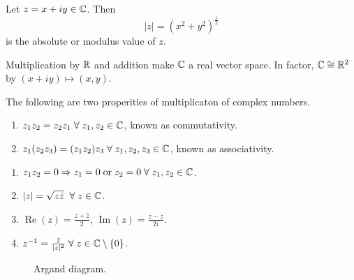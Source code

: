 \begin{definition}
    Let $z = x + iy \in \mathbb{C}$. Then \[ \lvert z \rvert = (x^2 + y^2)^\frac12 \] is the absolute or modulus value of $z$.
\end{definition}

\begin{remark}
    Multiplication by $\mathbb{R}$ and addition make $\mathbb{C}$ a real vector space. In factor, $\mathbb{C} \cong \mathbb{R}^2$ by $(x + iy) \mapsto (x, y)$.
\end{remark}

\begin{proposition}
    The following are two properities of multiplicaton of complex numbers.
    \begin{enumerate}
        \item $z_1z_2 = z_2z_1 \; \forall \; z_1, z_2 \in \mathbb{C}$, known as commutativity.
        \item $z_1(z_2z_3) = (z_1z_2)z_3 \; \forall \; z_1, z_2, z_3 \in \mathbb{C}$, known as associativity.
    \end{enumerate}
\end{proposition}

\begin{lemma}
    \begin{enumerate}
        \item $z_1z_2 = 0 \Rightarrow z_1 = 0 \; \text{or} \; z_2 = 0 \; \forall \; z_1, z_2 \in \mathbb{C}$.
        \item $\lvert z \rvert = \sqrt{z\bar{z}} \;\; \forall \; z \in \mathbb{C}$.
        \item $\operatorname{Re}{(z)} = \frac{z + \bar{z}}{2}$, $\operatorname{Im}{(z)} = \frac{z - \bar{z}}{2i}$.
        \item $z^{-1} = \frac{\bar{z}}{\lvert z \rvert^2} \; \forall \; z \in \mathbb{C} \setminus \{ 0 \}$.
    \end{enumerate}
\end{lemma}

\begin{figure}
    \centering
    \caption{Argand diagram.}
    \label{fig:argand-diagram}
\end{figure}


